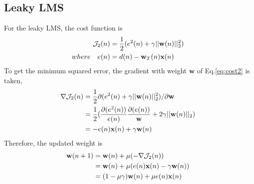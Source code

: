 \subsection{Leaky LMS}
For the leaky LMS, the cost function is 
\begin{align}
\mathcal J_2(n)&=\frac{1}{2}(e^2(n)+\gamma ||\mathbf {w}(n)||_2^2)\label{eq:cost2}\\
where \quad e(n)&=d(n)-\mathbf{w}_T(n)\mathbf {x}(n)\notag
\end{align}
To get the minimum squared error, the gradient with weight $\mathbf{w}$ of Eq.\ref{eq:cost2} is taken, 
\begin{align}
\nabla \mathcal J_2(n)&=\frac{1}{2}\partial (e^2(n)+\gamma ||\mathbf {w}(n)||_2^2)/\partial \mathbf {w}\notag\\
&=\frac{1}{2}(\frac{\partial(e^2(n))}{e(n)}\frac{\partial(e(n))}{\mathbf {w}}+2\gamma ||\mathbf {w}(n)||_2)\notag\\
&=-e(n)\mathbf{x}(n)+\gamma \mathbf {w}(n)
\label{eq:J2}
\end{align}
Therefore, the updated weight is 
\begin{align}
\mathbf {w}(n+1)&=\mathbf {w}(n)+\mu (-\nabla \mathcal J_2(n))\notag\\
				&=\mathbf {w}(n)+\mu (e(n)\mathbf{x}(n)-\gamma \mathbf {w}(n))\notag\\
				&=(1-\mu \gamma)\mathbf {w}(n)+\mu e(n)\mathbf{x}(n)
\label{eq:llms}
\end{align}
